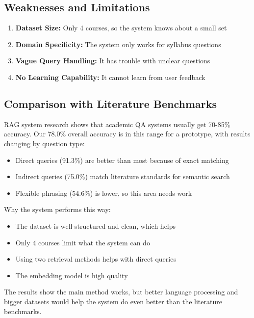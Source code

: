 \documentclass[conference]{IEEEtran}
\begin{document}
\subsection{\textbf{Weaknesses and Limitations}}
\begin{enumerate}
    \item \textbf{Dataset Size:} Only 4 courses, so the system knows about a small set
    \item \textbf{Domain Specificity:} The system only works for syllabus questions
    \item \textbf{Vague Query Handling:} It has trouble with unclear questions
    \item \textbf{No Learning Capability:} It cannot learn from user feedback
\end{enumerate}

\subsection{\textbf{Comparison with Literature Benchmarks}}
RAG system research shows that academic QA systems usually get 70-85\% accuracy. Our 78.0\% overall accuracy is in this range for a prototype, with results changing by question type:
\begin{itemize}
    \item Direct queries (91.3\%) are better than most because of exact matching
    \item Indirect queries (75.0\%) match literature standards for semantic search
    \item Flexible phrasing (54.6\%) is lower, so this area needs work
\end{itemize}

Why the system performs this way:
\begin{itemize}
    \item The dataset is well-structured and clean, which helps
    \item Only 4 courses limit what the system can do
    \item Using two retrieval methods helps with direct queries
    \item The embedding model is high quality
\end{itemize}

The results show the main method works, but better language processing and bigger datasets would help the system do even better than the literature benchmarks. \\ \\ 
\end{document}
